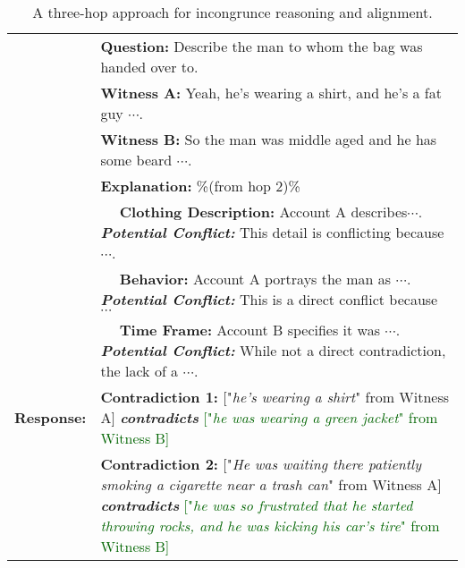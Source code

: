 \begin{table*}[ht]
{\begin{tabular}{|lp{62em}|}
        & \textbf{Question:} Describe the man to whom the bag was handed over to.  \\
        & \textbf{Witness A:} Yeah, he's wearing a shirt, and he's a fat guy $\cdots$. \\
        & \textbf{Witness B:} So the man was middle aged and he has some beard $\cdots$. \\
        & \textbf{Explanation:} \%(from hop 2)\% \\
        & $\quad$ \textbf{Clothing Description:} Account A describes$\cdots$. \textbf{\em Potential Conflict:} This detail is conflicting because $\cdots$.  \\
        & $\quad$ \textbf{Behavior:} Account A portrays the man as $\cdots$. \textbf{\em Potential Conflict:} This is a direct conflict because $\cdots$  \\
        & $\quad$ \textbf{Time Frame:} Account B specifies it was $\cdots$. \textbf{\em Potential Conflict:} While not a direct contradiction, the lack of a $\cdots$. \\
        \bf Response: & \textbf{Contradiction 1:} \textcolor{blue!90}{["\textit{he's wearing a shirt}" from Witness A]} \textcolor{red!90}{\textbf{\em contradicts}} \textcolor{darkgreen}{["\textit{he was wearing a green jacket}" from Witness B] }\\ 
        & \textbf{Contradiction 2:} \textcolor{blue!90}{["\textit{He was waiting there patiently smoking a cigarette near a trash can}" from Witness A]} \textcolor{red!90}{\textbf{\em contradicts}} \textcolor{darkgreen}{["\textit{he was so frustrated that he started throwing rocks, and he was kicking his car's tire}" from Witness B]} \\ \bottomrule
    \end{tabular}}
    \caption{A three-hop approach for incongrunce reasoning and alignment.}
    \label{tab:multi-hop}
\end{table*}


